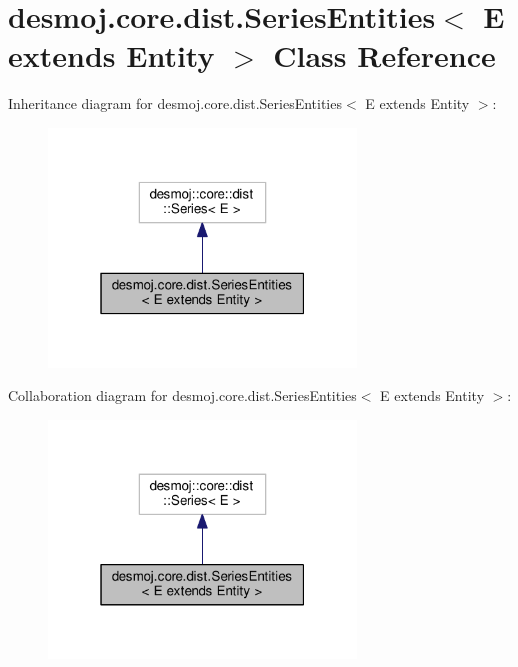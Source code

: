 \section{desmoj.\-core.\-dist.\-Series\-Entities$<$ E extends Entity $>$ Class Reference}
\label{classdesmoj_1_1core_1_1dist_1_1_series_entities_3_01_e_01extends_01_entity_01_4}


Inheritance diagram for desmoj.\-core.\-dist.\-Series\-Entities$<$ E extends Entity $>$\-:
\nopagebreak
\begin{figure}[H]
\begin{center}
\leavevmode
\includegraphics[width=232pt]{classdesmoj_1_1core_1_1dist_1_1_series_entities_3_01_e_01extends_01_entity_01_4__inherit__graph}
\end{center}
\end{figure}


Collaboration diagram for desmoj.\-core.\-dist.\-Series\-Entities$<$ E extends Entity $>$\-:
\nopagebreak
\begin{figure}[H]
\begin{center}
\leavevmode
\includegraphics[width=232pt]{classdesmoj_1_1core_1_1dist_1_1_series_entities_3_01_e_01extends_01_entity_01_4__coll__graph}
\end{center}
\end{figure}
